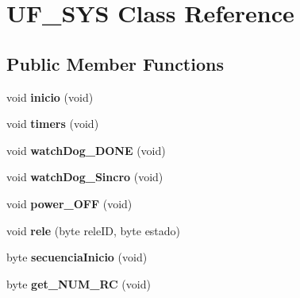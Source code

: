 \hypertarget{class_u_f___s_y_s}{}\section{U\+F\+\_\+\+S\+YS Class Reference}
\label{class_u_f___s_y_s}
\subsection*{Public Member Functions}
\begin{DoxyCompactItemize}
\item 
void {\bfseries inicio} (void)\hypertarget{class_u_f___s_y_s_a46ba7122a0bcd9ad4ffc6d13a9429874}{}\label{class_u_f___s_y_s_a46ba7122a0bcd9ad4ffc6d13a9429874}

\item 
void {\bfseries timers} (void)\hypertarget{class_u_f___s_y_s_afa8f5e3cae5409dc8d23ae953c55e355}{}\label{class_u_f___s_y_s_afa8f5e3cae5409dc8d23ae953c55e355}

\item 
void {\bfseries watch\+Dog\+\_\+\+D\+O\+NE} (void)\hypertarget{class_u_f___s_y_s_a3f4e272ba6d430b31528ce8e3b57f455}{}\label{class_u_f___s_y_s_a3f4e272ba6d430b31528ce8e3b57f455}

\item 
void {\bfseries watch\+Dog\+\_\+\+Sincro} (void)\hypertarget{class_u_f___s_y_s_a3850934586d233a04e310a00fca1027e}{}\label{class_u_f___s_y_s_a3850934586d233a04e310a00fca1027e}

\item 
void {\bfseries power\+\_\+\+O\+FF} (void)\hypertarget{class_u_f___s_y_s_a3c80f9b42d3078b6ff712e4f4ad22f7d}{}\label{class_u_f___s_y_s_a3c80f9b42d3078b6ff712e4f4ad22f7d}

\item 
void {\bfseries rele} (byte rele\+ID, byte estado)\hypertarget{class_u_f___s_y_s_ae79aab18bf501166e907d1baf1d0dbdc}{}\label{class_u_f___s_y_s_ae79aab18bf501166e907d1baf1d0dbdc}

\item 
byte {\bfseries secuencia\+Inicio} (void)\hypertarget{class_u_f___s_y_s_a1c86746925bb7ebad1de6f797d388bdd}{}\label{class_u_f___s_y_s_a1c86746925bb7ebad1de6f797d388bdd}

\item 
byte {\bfseries get\+\_\+\+N\+U\+M\+\_\+\+RC} (void)\hypertarget{class_u_f___s_y_s_a15aa5924ab020f9c094113cd701253e0}{}\label{class_u_f___s_y_s_a15aa5924ab020f9c094113cd701253e0}


\end{DoxyCompactItemize}
